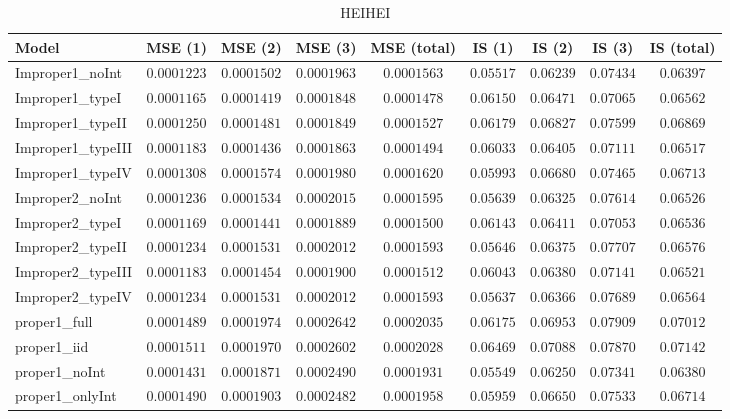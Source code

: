 \begin{table}

\caption{\label{tab:model-choice-sc9}HEIHEI}
\centering
\begin{tabular}{lcccccccc}
\hline
Model  & MSE (1) & MSE (2) & MSE (3) & MSE (total) & IS (1) & IS (2) & IS (3) & \multicolumn{1}{c}{IS (total)} \\ 
\hline
Improper1_noInt  & $0.0001223$ & $0.0001502$ & $0.0001963$ & $0.0001563$ & $0.05517$ & $0.06239$ & $0.07434$ & $0.06397$ \\
Improper1_typeI  & $0.0001165$ & $0.0001419$ & $0.0001848$ & $0.0001478$ & $0.06150$ & $0.06471$ & $0.07065$ & $0.06562$ \\
Improper1_typeII  & $0.0001250$ & $0.0001481$ & $0.0001849$ & $0.0001527$ & $0.06179$ & $0.06827$ & $0.07599$ & $0.06869$ \\
Improper1_typeIII  & $0.0001183$ & $0.0001436$ & $0.0001863$ & $0.0001494$ & $0.06033$ & $0.06405$ & $0.07111$ & $0.06517$ \\
Improper1_typeIV  & $0.0001308$ & $0.0001574$ & $0.0001980$ & $0.0001620$ & $0.05993$ & $0.06680$ & $0.07465$ & $0.06713$ \\
Improper2_noInt  & $0.0001236$ & $0.0001534$ & $0.0002015$ & $0.0001595$ & $0.05639$ & $0.06325$ & $0.07614$ & $0.06526$ \\
Improper2_typeI  & $0.0001169$ & $0.0001441$ & $0.0001889$ & $0.0001500$ & $0.06143$ & $0.06411$ & $0.07053$ & $0.06536$ \\
Improper2_typeII  & $0.0001234$ & $0.0001531$ & $0.0002012$ & $0.0001593$ & $0.05646$ & $0.06375$ & $0.07707$ & $0.06576$ \\
Improper2_typeIII  & $0.0001183$ & $0.0001454$ & $0.0001900$ & $0.0001512$ & $0.06043$ & $0.06380$ & $0.07141$ & $0.06521$ \\
Improper2_typeIV  & $0.0001234$ & $0.0001531$ & $0.0002012$ & $0.0001593$ & $0.05637$ & $0.06366$ & $0.07689$ & $0.06564$ \\
proper1_full  & $0.0001489$ & $0.0001974$ & $0.0002642$ & $0.0002035$ & $0.06175$ & $0.06953$ & $0.07909$ & $0.07012$ \\
proper1_iid  & $0.0001511$ & $0.0001970$ & $0.0002602$ & $0.0002028$ & $0.06469$ & $0.07088$ & $0.07870$ & $0.07142$ \\
proper1_noInt  & $0.0001431$ & $0.0001871$ & $0.0002490$ & $0.0001931$ & $0.05549$ & $0.06250$ & $0.07341$ & $0.06380$ \\
proper1_onlyInt  & $0.0001490$ & $0.0001903$ & $0.0002482$ & $0.0001958$ & $0.05959$ & $0.06650$ & $0.07533$ & $0.06714$ \\

\end{tabular}
\end{table}
